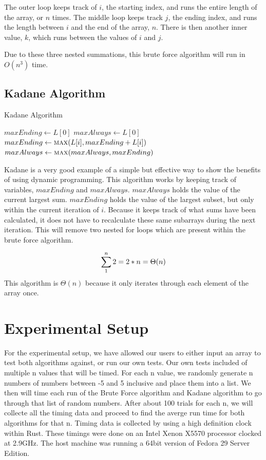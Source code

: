 \documentclass[10pt, letterpaper]{article}
\begin{document}
	The outer loop keeps track of $i$, the starting index, and runs the entire length of the array, or $n$ times.
	The middle loop keeps track $j$, the ending index, and runs the length between $i$ and the end of the array, $n$.
	There is then another inner value, $k$, which runs between the values of $i$ and $j$.

	Due to these three nested summations, this brute force algorithm will run in $O(n^3)$ time.

	\subsection{Kadane Algorithm}

  \begin{algorithm}
		\caption{Kadane Algorithm}\label{kadane}
	\begin{algorithmic}
    \State $maxEnding \gets L[0]$
    \State $maxAlways \gets L[0]$
    \State $maxEnding \gets \Call{max}{L[i], maxEnding + L[i]}$
    \State $maxAlways \gets \Call{max}{maxAlways, maxEnding}$
    \EndFor
	  \EndFunction
	\end{algorithmic}
	\end{algorithm}
  Kadane is a very good example of a simple but effective way to show the benefits of using dynamic programming.
  This algorithm works by keeping track of variables, $maxEnding$ and $maxAlways$.
  $maxAlways$ holds the value of the current largest sum.
  $maxEnding$ holds the value of the largest subset, but only within the current iteration of $i$. 
  Because it keeps track of what sums have been calculated, it does not have to recalculate these same subarrays during the next iteration.
  This will remove two nested for loops which are present within the brute force algorithm.

  \[
  \sum_1^n2 \\
  = 2 * n \\
  = \Theta(n)
		\]
	This algorithm is $\Theta(n)$ because it only iterates through each element of the array once.
	\section{Experimental Setup}
	For the experimental setup, we have allowed our users to either input an array to test both algorithms against, or run our own tests.
  Our own tests included of multiple n values that will be timed. For each n value, we randomly generate n numbers of numbers between -5 and 5 inclusive and place them into a list. We then will time each run of the Brute Force algorithm and Kadane algorithm to go through that list of random numbers. After about 100 trials for each n, we will collecte all the timing data and proceed to find the averge run time for both algorithms for that n.
  Timing data is collected by using a high definition clock within Rust. These timings were done on an Intel Xenon X5570 processor clocked at 2.9GHz. The host machine was running a 64bit version of Fedora 29 Server Edition.
\end{document}
